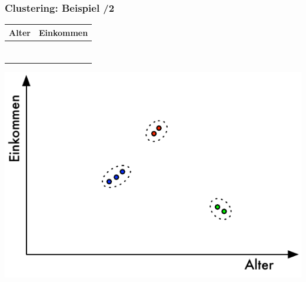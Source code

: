\begin{frame}[c]
\frametitle{Clustering: Beispiel /2}

\begin{minipage}[c]{3.5cm}
{\small\begin{tabular}{|c|r|}
  \rowcolor{Gray}\hline
Alter & Einkommen \\
\hline
\hline
\color{blue}{25} & \color{blue}{50.000} \\
\color{blue}{27} & \color{blue}{55.000} \\
\color{blue}{26} & \color{blue}{58.000} \\
\color{red}{40} & \color{red}{85.500} \\
\color{red}{42} & \color{red}{90.000} \\
\color{green}{57} & \color{green}{38.000} \\
\color{green}{59} & \color{green}{40.000} \\
\hline
\end{tabular}}
\end{minipage}\quad
\begin{minipage}[c]{6cm}
\includegraphics[scale=.7]{fig1/clustering.pdf}
\end{minipage}

\end{frame}





